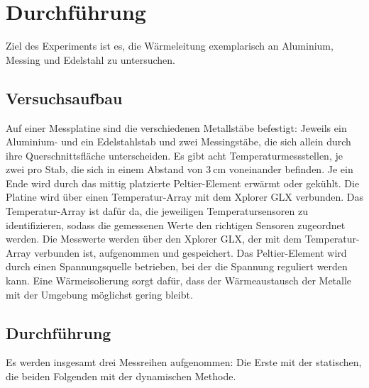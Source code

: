 \section{Durchführung}
\label{sec:Durchführung}
Ziel des Experiments ist es, die Wärmeleitung exemplarisch an Aluminium, Messing und Edelstahl zu untersuchen. 
\subsection{Versuchsaufbau}
Auf einer Messplatine sind die verschiedenen Metallstäbe befestigt: 
Jeweils ein Aluminium- und ein Edelstahlstab und zwei Messingstäbe, die sich allein durch ihre Querschnittsfläche unterscheiden.
Es gibt acht Temperaturmessstellen, je zwei pro Stab, die sich in einem Abstand von $\SI{3}{\centi\meter}$ voneinander befinden. 
Je ein Ende wird durch das mittig platzierte Peltier-Element erwärmt oder gekühlt. 
Die Platine wird über einen Temperatur-Array mit dem Xplorer GLX verbunden. 
Das Temperatur-Array ist dafür da, die jeweiligen Temperatursensoren zu identifizieren, sodass die gemessenen Werte den richtigen Sensoren zugeordnet werden.
Die Messwerte werden über den Xplorer GLX, der mit dem Temperatur-Array verbunden ist, aufgenommen und gespeichert. 
Das Peltier-Element wird durch einen Spannungsquelle betrieben, bei der die Spannung reguliert werden kann. 
Eine Wärmeisolierung sorgt dafür, dass der Wärmeaustausch der Metalle mit der Umgebung möglichst gering bleibt.
\subsection{Durchführung}
Es werden insgesamt drei Messreihen aufgenommen: Die Erste mit der statischen, die beiden Folgenden mit der dynamischen Methode.
